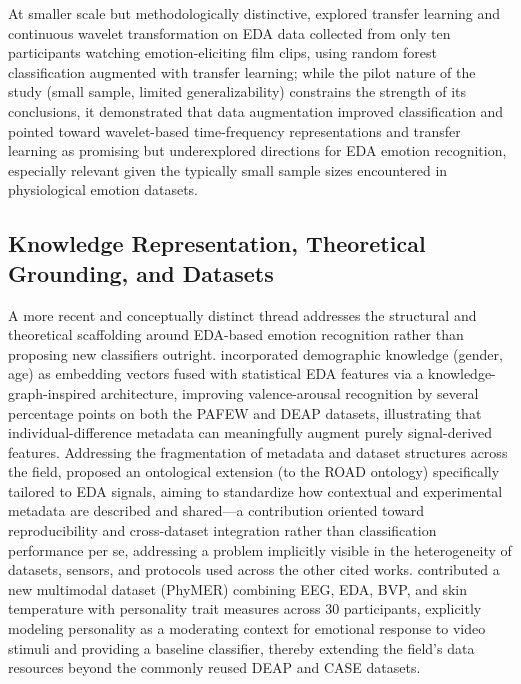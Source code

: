 At smaller scale but methodologically distinctive, \cite{jacobsen2021classification} explored transfer learning and continuous wavelet transformation on EDA data collected from only ten participants watching emotion-eliciting film clips, using random forest classification augmented with transfer learning; while the pilot nature of the study (small sample, limited generalizability) constrains the strength of its conclusions, it demonstrated that data augmentation improved classification and pointed toward wavelet-based time-frequency representations and transfer learning as promising but underexplored directions for EDA emotion recognition, especially relevant given the typically small sample sizes encountered in physiological emotion datasets.

\subsection{Knowledge Representation, Theoretical Grounding, and Datasets}
A more recent and conceptually distinct thread addresses the structural and theoretical scaffolding around EDA-based emotion recognition rather than proposing new classifiers outright. \cite{fordson2022emotion} incorporated demographic knowledge (gender, age) as embedding vectors fused with statistical EDA features via a knowledge-graph-inspired architecture, improving valence-arousal recognition by several percentage points on both the PAFEW and DEAP datasets, illustrating that individual-difference metadata can meaningfully augment purely signal-derived features. Addressing the fragmentation of metadata and dataset structures across the field, \cite{zawadzka2023ontological} proposed an ontological extension (to the ROAD ontology) specifically tailored to EDA signals, aiming to standardize how contextual and experimental metadata are described and shared---a contribution oriented toward reproducibility and cross-dataset integration rather than classification performance per se, addressing a problem implicitly visible in the heterogeneity of datasets, sensors, and protocols used across the other cited works. \cite{pant2023phymer} contributed a new multimodal dataset (PhyMER) combining EEG, EDA, BVP, and skin temperature with personality trait measures across 30 participants, explicitly modeling personality as a moderating context for emotional response to video stimuli and providing a baseline classifier, thereby extending the field's data resources beyond the commonly reused DEAP and CASE datasets.

